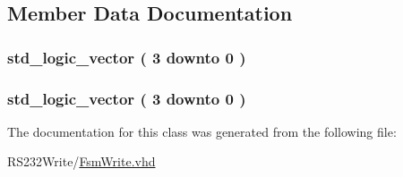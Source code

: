 \subsection{Member Data Documentation}
\hypertarget{class_fsm_write_1_1simple_a70a8d40eb6414ccea4a1bbd562251964}{}
\subsubsection[{Qn}]{ {\bfseries \textcolor{comment}{std\+\_\+logic\+\_\+vector}\textcolor{vhdlchar}{ }\textcolor{vhdlchar}{(}\textcolor{vhdlchar}{ }\textcolor{vhdlchar}{ } \textcolor{vhdldigit}{3} \textcolor{vhdlchar}{ }\textcolor{keywordflow}{downto}\textcolor{vhdlchar}{ }\textcolor{vhdlchar}{ } \textcolor{vhdldigit}{0} \textcolor{vhdlchar}{ }\textcolor{vhdlchar}{)}\textcolor{vhdlchar}{ }} \hspace{0.3cm}{\ttfamily [Signal]}}\label{class_fsm_write_1_1simple_a70a8d40eb6414ccea4a1bbd562251964}
\hypertarget{class_fsm_write_1_1simple_a1374ca621da8c3ce3b11dc3a52dec0cf}{}
\subsubsection[{Qp}]{ {\bfseries \textcolor{comment}{std\+\_\+logic\+\_\+vector}\textcolor{vhdlchar}{ }\textcolor{vhdlchar}{(}\textcolor{vhdlchar}{ }\textcolor{vhdlchar}{ } \textcolor{vhdldigit}{3} \textcolor{vhdlchar}{ }\textcolor{keywordflow}{downto}\textcolor{vhdlchar}{ }\textcolor{vhdlchar}{ } \textcolor{vhdldigit}{0} \textcolor{vhdlchar}{ }\textcolor{vhdlchar}{)}\textcolor{vhdlchar}{ }} \hspace{0.3cm}{\ttfamily [Signal]}}\label{class_fsm_write_1_1simple_a1374ca621da8c3ce3b11dc3a52dec0cf}


The documentation for this class was generated from the following file\+:\begin{DoxyCompactItemize}
\item 
R\+S232\+Write/\hyperlink{_fsm_write_8vhd}{Fsm\+Write.\+vhd}\end{DoxyCompactItemize}
